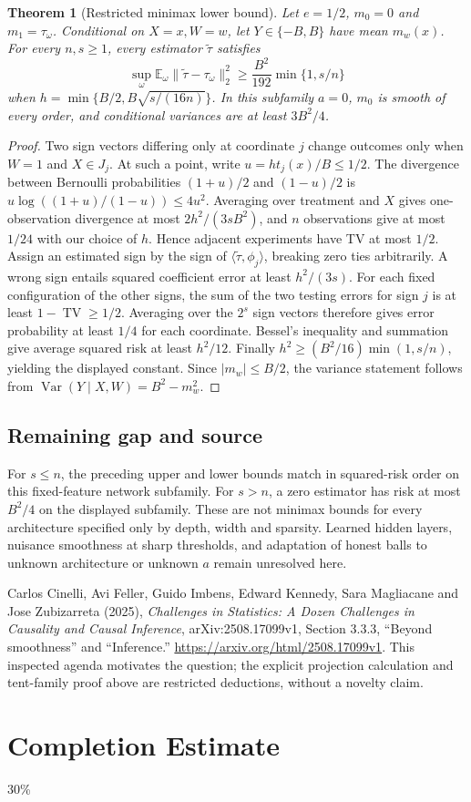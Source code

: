 \documentclass[11pt,a4paper]{article}
\newtheorem{theorem}{Theorem}
\newcommand{\E}{\mathbb E}
\newcommand{\TV}{\operatorname{TV}}
\newcommand{\Var}{\operatorname{Var}}
\begin{document}
\begin{theorem}[Restricted minimax lower bound]
Let $e=1/2$, $m_0=0$ and $m_1=\tau_\omega$. Conditional on $X=x,W=w$, let $Y\in\{-B,B\}$ have mean $m_w(x)$. For every $n,s\geq1$, every estimator $\widetilde\tau$ satisfies
\[
 \sup_\omega\E_\omega\|\widetilde\tau-\tau_\omega\|_2^2
 \geq\frac{B^2}{192}\min\{1,s/n\}
\]
when $h=\min\{B/2,B\sqrt{s/(16n)}\}$. In this subfamily $a=0$, $m_0$ is smooth of every order, and conditional variances are at least $3B^2/4$.
\end{theorem}
\begin{proof}
Two sign vectors differing only at coordinate $j$ change outcomes only when $W=1$ and $X\in J_j$. At such a point, write $u=ht_j(x)/B\leq1/2$. The divergence between Bernoulli probabilities $(1+u)/2$ and $(1-u)/2$ is $u\log((1+u)/(1-u))\leq4u^2$. Averaging over treatment and $X$ gives one-observation divergence at most $2h^2/(3sB^2)$, and $n$ observations give at most $1/24$ with our choice of $h$. Hence adjacent experiments have TV at most $1/2$.
Assign an estimated sign by the sign of $\langle\widetilde\tau,\phi_j\rangle$, breaking zero ties arbitrarily. A wrong sign entails squared coefficient error at least $h^2/(3s)$. For each fixed configuration of the other signs, the sum of the two testing errors for sign $j$ is at least $1-\TV\geq1/2$. Averaging over the $2^s$ sign vectors therefore gives error probability at least $1/4$ for each coordinate. Bessel's inequality and summation give average squared risk at least $h^2/12$.
Finally $h^2\geq (B^2/16)\min(1,s/n)$, yielding the displayed constant. Since $|m_w|\leq B/2$, the variance statement follows from $\Var(Y\mid X,W)=B^2-m_w^2$.
\end{proof}

\subsection*{Remaining gap and source}
For $s\leq n$, the preceding upper and lower bounds match in squared-risk order on this fixed-feature network subfamily. For $s>n$, a zero estimator has risk at most $B^2/4$ on the displayed subfamily. These are not minimax bounds for every architecture specified only by depth, width and sparsity. Learned hidden layers, nuisance smoothness at sharp thresholds, and adaptation of honest balls to unknown architecture or unknown $a$ remain unresolved here.

Carlos Cinelli, Avi Feller, Guido Imbens, Edward Kennedy, Sara Magliacane and Jose Zubizarreta (2025), \emph{Challenges in Statistics: A Dozen Challenges in Causality and Causal Inference}, arXiv:2508.17099v1, Section 3.3.3, ``Beyond smoothness'' and ``Inference.'' \url{https://arxiv.org/html/2508.17099v1}. This inspected agenda motivates the question; the explicit projection calculation and tent-family proof above are restricted deductions, without a novelty claim.

\section{Completion Estimate}
30\%
\end{document}
